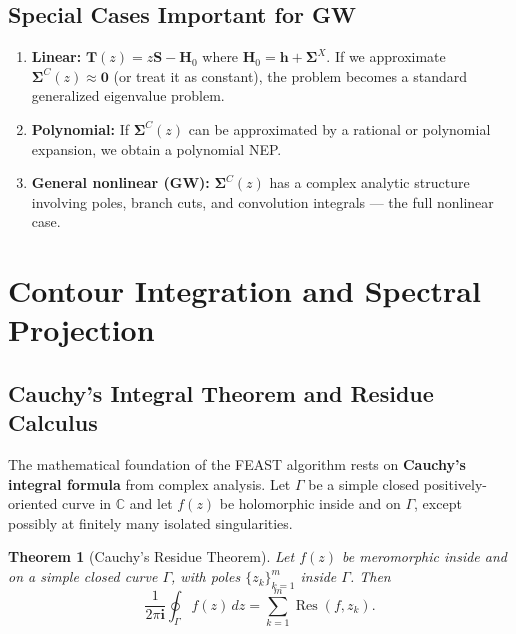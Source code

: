 \documentclass[12pt,a4paper]{article}
\newtheorem{theorem}{Theorem}[section]
\theoremstyle{definition}
\DeclareMathOperator{\Res}{Res}
\begin{document}
\subsection{Special Cases Important for GW}

\begin{enumerate}[label=(\roman*)]
    \item \textbf{Linear:} $\mathbf{T}(z) = z\mathbf{S} - \mathbf{H}_0$ where $\mathbf{H}_0 = \mathbf{h} + \mathbf{\Sigma}^{X}$. If we approximate $\mathbf{\Sigma}^{C}(z) \approx \mathbf{0}$ (or treat it as constant), the problem becomes a standard generalized eigenvalue problem.
    \item \textbf{Polynomial:} If $\mathbf{\Sigma}^{C}(z)$ can be approximated by a rational or polynomial expansion, we obtain a polynomial NEP.
    \item \textbf{General nonlinear (GW):} $\mathbf{\Sigma}^{C}(z)$ has a complex analytic structure involving poles, branch cuts, and convolution integrals --- the full nonlinear case.
\end{enumerate}

\section{Contour Integration and Spectral Projection}

\subsection{Cauchy's Integral Theorem and Residue Calculus}

The mathematical foundation of the FEAST algorithm rests on \textbf{Cauchy's integral formula} from complex analysis. Let $\Gamma$ be a simple closed positively-oriented curve in $\mathbb{C}$ and let $f(z)$ be holomorphic inside and on $\Gamma$, except possibly at finitely many isolated singularities.

\begin{theorem}[Cauchy's Residue Theorem]\label{thm:cauchy}
Let $f(z)$ be meromorphic inside and on a simple closed curve $\Gamma$, with poles $\{z_k\}_{k=1}^{m}$ inside $\Gamma$. Then
\begin{equation}
\frac{1}{2\pi\mathbf{i}} \oint_{\Gamma} f(z)\,dz = \sum_{k=1}^{m} \Res(f, z_k).
\end{equation}
\end{theorem}
\end{document}

